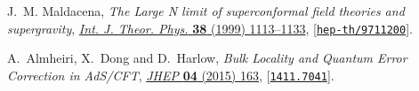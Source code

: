 \documentclass[12pt]{article}
\begin{document}
\begin{thebibliography}{100}
J.~M. Maldacena, \emph{{The Large N limit of superconformal field theories and
  supergravity}}, \href{http://dx.doi.org/10.1023/A:1026654312961}{\emph{Int.
  J. Theor. Phys.} {\bf 38} (1999) 1113--1133},
  [\href{http://arxiv.org/abs/hep-th/9711200}{{\tt hep-th/9711200}}].

A.~Almheiri, X.~Dong and D.~Harlow, \emph{{Bulk Locality and Quantum Error
  Correction in AdS/CFT}},
  \href{http://dx.doi.org/10.1007/JHEP04(2015)163}{\emph{JHEP} {\bf 04} (2015)
  163}, [\href{http://arxiv.org/abs/1411.7041}{{\tt 1411.7041}}].

\end{thebibliography}
 
\end{document}
